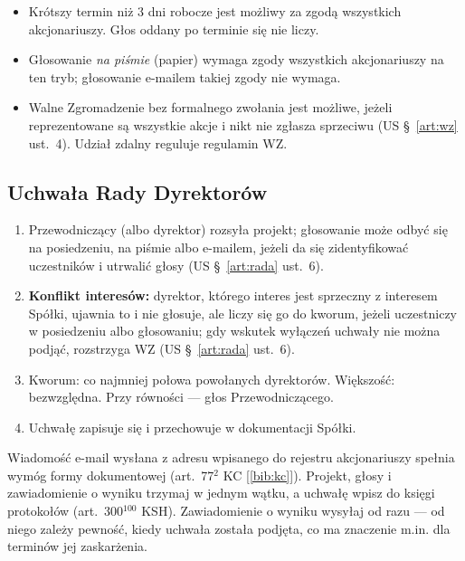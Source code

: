 \documentclass[11pt,a4paper]{report}
\newcommand{\Zr}[1]{[\ref{bib:#1}]}
\begin{document}
\begin{itemize}
  \item Krótszy termin niż 3 dni robocze jest możliwy za zgodą wszystkich akcjonariuszy. Głos oddany po terminie się nie liczy.
  \item Głosowanie \emph{na piśmie} (papier) wymaga zgody wszystkich akcjonariuszy na ten tryb; głosowanie e-mailem takiej zgody nie wymaga.
  \item Walne Zgromadzenie bez formalnego zwołania jest możliwe, jeżeli reprezentowane są wszystkie akcje i nikt nie zgłasza sprzeciwu (US §~\ref{art:wz} ust.~4). Udział zdalny reguluje regulamin WZ.
\end{itemize}

\subsection*{Uchwała Rady Dyrektorów}

\begin{enumerate}
  \item Przewodniczący (albo dyrektor) rozsyła projekt; głosowanie może odbyć się na posiedzeniu, na piśmie albo e-mailem, jeżeli da się zidentyfikować uczestników i utrwalić głosy (US §~\ref{art:rada} ust.~6).
  \item \textbf{Konflikt interesów:} dyrektor, którego interes jest sprzeczny z interesem Spółki, ujawnia to i nie głosuje, ale liczy się go do kworum, jeżeli uczestniczy w posiedzeniu albo głosowaniu; gdy wskutek wyłączeń uchwały nie można podjąć, rozstrzyga WZ (US §~\ref{art:rada} ust.~6).
  \item Kworum: co najmniej połowa powołanych dyrektorów. Większość: bezwzględna. Przy równości --- głos Przewodniczącego.
  \item Uchwałę zapisuje się i przechowuje w dokumentacji Spółki.
\end{enumerate}

\begin{Komentarz}
Wiadomość e-mail wysłana z adresu wpisanego do rejestru akcjonariuszy spełnia wymóg formy dokumentowej (art.~77$^{2}$ KC \Zr{kc}). Projekt, głosy i zawiadomienie o wyniku trzymaj w jednym wątku, a uchwałę wpisz do księgi protokołów (art.~300$^{100}$ KSH). Zawiadomienie o wyniku wysyłaj od razu --- od niego zależy pewność, kiedy uchwała została podjęta, co ma znaczenie m.in. dla terminów jej zaskarżenia.
\end{Komentarz}
\end{document}

